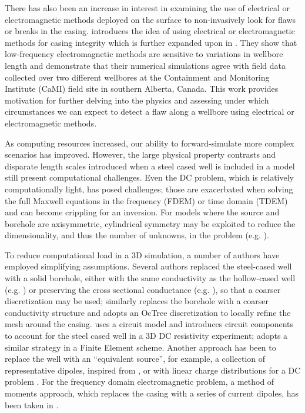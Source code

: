 There has also been an increase in interest in examining the use of electrical or electromagnetic methods deployed on the surface to non-invasively look for flaws or breaks in the casing. \cite{Wilt2018} introduces the idea of using electrical or electromagnetic methods for casing integrity which is further expanded upon in \cite{Wilt2018a}. They show that low-frequency electromagnetic methods are sensitive to variations in wellbore length and demonstrate that their numerical simulations agree with field data collected over two different wellbores at the Containment and Monitoring Institute (CaMI) field site in southern Alberta, Canada. This work provides motivation for further delving into the physics and assessing under which circumstances we can expect to detect a flaw along a wellbore using electrical or electromagnetic methods.

As computing resources increased, our ability to forward-simulate more complex scenarios has improved. However, the large physical property contrasts and disparate length scales introduced when a steel cased well is included in a model still present computational challenges. Even the DC problem, which is relatively computationally light, has posed challenges; those are exacerbated when solving the full Maxwell equations in the frequency (FDEM) or time domain (TDEM) and can become crippling for an inversion. For models where the source and borehole are axisymmetric, cylindrical symmetry may be exploited to reduce the dimensionality, and thus the number of unknowns, in the problem (e.g. \cite{Pardo2013, Heagy2015}).

To reduce computational load in a 3D simulation, a number of authors have employed simplifying assumptions. Several authors replaced the steel-cased well with a solid borehole, either with the same conductivity as the hollow-cased well (e.g. \cite{Um2015, Puzyrev2017}) or preserving the cross sectional conductance (e.g. \cite{Swidinsky2013, Kohnke2017}), so that a coarser discretization may be used; \cite{Haber2016} similarly replaces the borehole with a coarser conductivity structure and adopts an OcTree discretization to locally refine the mesh around the casing. \cite{Yang2016} uses a circuit model and introduces circuit components to account for the steel cased well in a 3D DC resistivity experiment; \cite{Weiss2017} adopts a similar strategy in a Finite Element scheme. Another approach has been to replace the well with an ``equivalent source'', for example, a collection of representative dipoles, inspired from \cite{cuevas2014}, or with linear charge distributions for a DC problem \citep{Weiss2016}. For the frequency domain electromagnetic problem, a method of moments approach, which replaces the casing with a series of current dipoles, has been taken in \cite{Kohnke2017}.

